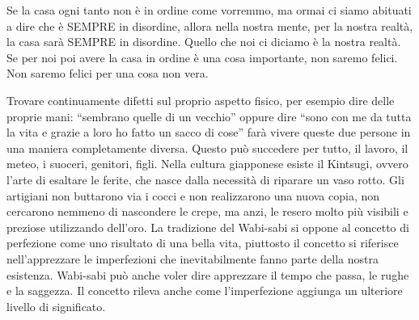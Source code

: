 \documentclass[12pt]{book} %
\begin{document}
Se la casa ogni tanto non è in ordine come vorremmo, ma ormai ci siamo abituati a dire che è SEMPRE in disordine, allora
nella nostra mente, per la nostra realtà, la casa sarà SEMPRE in disordine. Quello che noi ci diciamo è la nostra
realtà. Se per noi poi avere la casa in ordine è una cosa importante, non saremo felici. Non saremo felici per una cosa
non vera.

Trovare continuamente difetti sul proprio aspetto fisico, per esempio dire delle proprie mani: “sembrano quelle di un
vecchio” oppure dire “sono con me da tutta la vita e grazie a loro ho fatto un sacco di cose” farà vivere queste due
persone in una maniera completamente diversa. Questo può succedere per tutto, il lavoro, il meteo, i suoceri, genitori,
figli. Nella cultura giapponese esiste il Kintsugi, ovvero l'arte di esaltare le ferite, che nasce
dalla necessità di riparare un vaso rotto. Gli artigiani non buttarono via i cocci e non realizzarono una nuova copia,
non cercarono nemmeno di nascondere le crepe, ma anzi, le resero molto più visibili e preziose utilizzando
dell'oro. La tradizione del Wabi-sabi si oppone al concetto di perfezione come uno risultato di
una bella vita, piuttosto il concetto si riferisce nell'apprezzare le imperfezioni che
inevitabilmente fanno parte della nostra esistenza. Wabi-sabi può anche voler dire apprezzare il tempo che passa, le
rughe e la saggezza. Il concetto rileva anche come l'imperfezione aggiunga un ulteriore livello di
significato.
\end{document}
